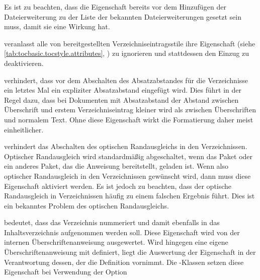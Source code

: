 \begin{description}
  Es ist zu beachten, dass die Eigenschaft bereits vor dem
  Hinzufügen der Dateierweiterung zu der Liste der bekannten
  Dateierweiterungen gesetzt sein muss, damit sie eine Wirkung hat.
\item[\PValue{noindent}] veranlasst alle
  von \KOMAScript{} bereitgestellten Verzeichniseintragsstile ihre Eigenschaft
   (siehe \autoref{tab:tocbasic.tocstyle.attributes},
  ) zu ignorieren und
  stattdessen den Einzug zu deaktivieren.
\item[\PValue{noparskipfake}] verhindert,
  dass vor dem Abschalten des Absatzabstandes für die Verzeichnisse ein
  letztes Mal ein expliziter Absatzabstand eingefügt wird. Dies führt in der
  Regel dazu, dass bei Dokumenten mit Absatzabstand der Abstand zwischen
  Überschrift und erstem Verzeichniseintrag kleiner
  wird als zwischen Überschriften und normalem Text. %
  \iffalse%
  Normalerweise erhält man daher ohne diese Eigenschaft eine einheitlichere
  Formatierung.%
  \else%
  Ohne diese Eigenschaft wirkt die Formatierung daher meist einheitlicher.%
  \fi%
\item[\PValue{noprotrusion}] verhindert
  das Abschalten des optischen Randausgleichs in den Verzeichnissen. Optischer
  Randausgleich wird standardmäßig abgeschaltet, wenn das Paket
   oder ein anderes Paket, das die
  Anweisung  bereitstellt,
  geladen ist. Wenn also optischer Randausgleich in den Verzeichnissen
  gewünscht wird, dann muss diese Eigenschaft aktiviert
  werden. Es ist jedoch zu beachten, dass der optische
  Randausgleich in Verzeichnissen häufig zu einem falschen Ergebnis
  führt. Dies ist ein bekanntes Problem des optischen Randausgleichs.
\item[\PValue{numbered}] bedeutet, dass das Verzeichnis nummeriert und damit
  ebenfalls in das Inhaltsverzeichnis aufgenommen werden soll. Diese
  Eigenschaft wird von der internen Überschriftenanweisung ausgewertet. Wird
  hingegen eine eigene Überschriftenanweisung mit
   definiert, liegt die Auswertung der
  Eigenschaft in der Verantwortung dessen, der die Definition vornimmt.  Die
  \KOMAScript-Klassen setzen diese Eigenschaft bei Verwendung der Option

\end{description}

